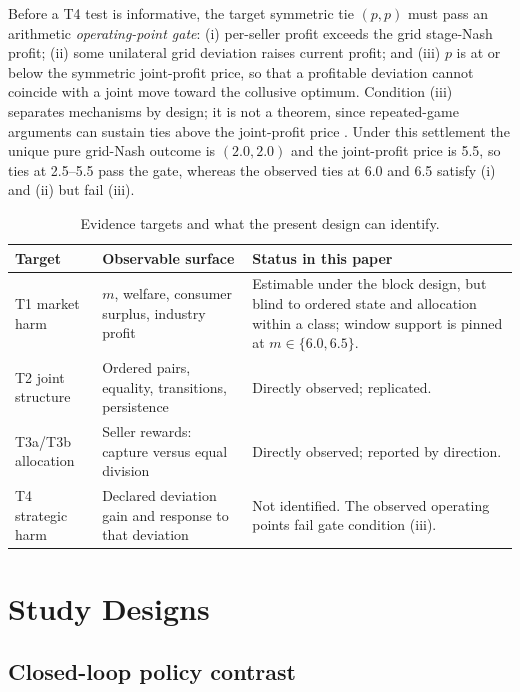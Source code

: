 \documentclass[sigconf,review,anonymous]{acmart}
\begin{document}
Before a T4 test is informative, the target symmetric tie $(p,p)$ must pass an arithmetic \emph{operating-point gate}: (i) per-seller profit exceeds the grid stage-Nash profit; (ii) some unilateral grid deviation raises current profit; and (iii) $p$ is at or below the symmetric joint-profit price, so that a profitable deviation cannot coincide with a joint move toward the collusive optimum. Condition (iii) separates mechanisms by design; it is not a theorem, since repeated-game arguments can sustain ties above the joint-profit price \cite{fudenberg1986folk}. Under this settlement the unique pure grid-Nash outcome is $(2.0,2.0)$ and the joint-profit price is 5.5, so ties at 2.5--5.5 pass the gate, whereas the observed ties at 6.0 and 6.5 satisfy (i) and (ii) but fail (iii).

\begin{table}[t]
  \centering
  \caption{Evidence targets and what the present design can identify.}
  \label{tab:targets}
  \small
  \begin{tabular}{@{}>{\raggedright\arraybackslash}p{}>{\raggedright\arraybackslash}p{}>{\raggedright\arraybackslash}p{}@{}}
    \toprule
    Target & Observable surface & Status in this paper \\
    \midrule
    T1 market harm & $m$, welfare, consumer surplus, industry profit & Estimable under the block design, but blind to ordered state and allocation within a class; window support is pinned at $m\in\{6.0,6.5\}$. \\
    T2 joint structure & Ordered pairs, equality, transitions, persistence & Directly observed; replicated. \\
    T3a/T3b allocation & Seller rewards: capture versus equal division & Directly observed; reported by direction. \\
    T4 strategic harm & Declared deviation gain and response to that deviation & Not identified. The observed operating points fail gate condition (iii). \\
    \bottomrule
  \end{tabular}
\end{table}

\section{Study Designs}\label{sec:designs}

\subsection{Closed-loop policy contrast}
\end{document}
